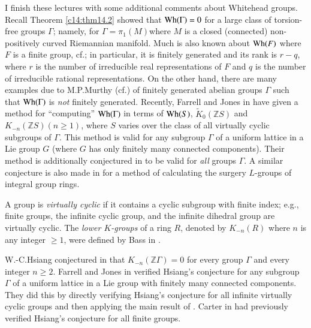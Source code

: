 I finish these lectures with some additional comments about Whitehead
groups. Recall Theorem \ref{c14:thm14.2} showed that $\operatorname{Wh}(\Gamma)=0$
for a large class of torsion-free groups $\Gamma$; namely, for
$\Gamma=\pi_{1}(M)$\pageoriginale where $M$ is a closed (connected)
non-positively curved Riemannian manifold. Much is also known about
$\operatorname{Wh}(F)$ where $F$ is a finite group, cf.\@ \cite{4}; in particular,
it is finitely generated and its rank is $r-q$, where $r$ is the
number of irreducible real representations of $F$ and $q$ is the
number of irreducible rational representations. On the other hand,
there are many examples due to M.P.\@ Murthy (cf.\@ \cite{4}) of
finitely generated abelian groups $\Gamma$ such that $\operatorname{Wh}(\Gamma)$ is
{\em not} finitely generated. Recently, Farrell and Jones in \cite{45}
have given a method for ``computing'' $\operatorname{Wh}(\Gamma)$ in terms of
$\operatorname{Wh}(S)$, $\tilde{K}_{0}(\mathbb{Z}S)$ and $K_{-n}(\mathbb{Z}S)(n\geq
1)$, where $S$ varies over the class of all virtually cyclic subgroups
of $\Gamma$. This method is valid for any subgroup $\Gamma$ of a
uniform lattice in a Lie group $G$ (where $G$ has only finitely many
connected components). Their method is additionally conjectured in
\cite{45} to be valid for {\em all} groups $\Gamma$. A similar
conjecture is also made in \cite{45} for a method of calculating the
surgery $L$-groups of integral group rings.

\begin{remarks*}
A group is {\em virtually cyclic} if it contains a cyclic subgroup
with finite index; e.g., finite groups, the infinite cyclic group, and
the infinite dihedral group are virtually cyclic. The {\em lower
  $K$-groups} of a ring $R$, denoted by $K_{-n}(R)$ where $n$ is any
integer $\geq 1$, were defined by Bass in \cite{4}.
\end{remarks*}

W.-C.\@ Hsiang conjectured in \cite{62} that
$K_{-n}(\mathbb{Z}\Gamma)=0$ for every group $\Gamma$ and every
integer $n\geq 2$. Farrell and Jones in \cite{48} verified Hsiang's
conjecture for any subgroup $\Gamma$ of a uniform lattice in a Lie
group with finitely many connected components. They did this by
directly verifying Hsiang's conjecture for all infinite virtually
cyclic groups and then applying the main result of \cite{45}. Carter
in \cite{17} had previously verified Hsiang's conjecture for all
finite groups.



